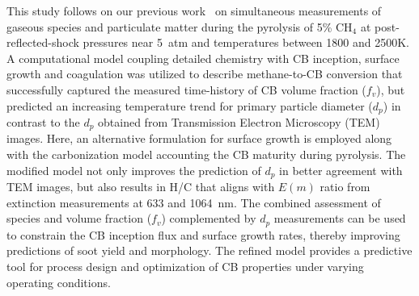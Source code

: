 This study follows on our previous work~\citep{clark2025} on simultaneous measurements of gaseous species and particulate matter during the pyrolysis of 5\% $\mathrm{CH_4}$ at post-reflected-shock pressures near 5~atm and temperatures between 1800 and 2500K. A computational model coupling detailed chemistry with CB inception, surface growth and coagulation was utilized to describe methane-to-CB conversion that successfully captured the measured time-history of CB volume fraction ($f_v$), but predicted an increasing temperature trend for primary particle diameter ($d_p$) in contrast to the $d_p$ obtained from Transmission Electron Microscopy (TEM) images. Here, an alternative formulation for surface growth is employed along with the carbonization model accounting the CB maturity during pyrolysis. The modified model not only improves the prediction of $d_p$ in better agreement with TEM images, but also results in H/C that aligns with $E(m)$ ratio from extinction measurements at 633 and 1064~nm. The combined assessment of species and volume fraction ($f_v$) complemented by $d_p$ measurements can be used to constrain the CB inception flux and surface growth rates, thereby improving predictions of soot yield and morphology. The refined model provides a predictive tool for process design and optimization of CB properties under varying operating conditions.

